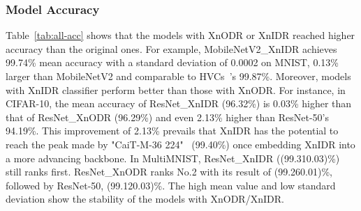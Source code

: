 \documentclass[sn-mathphys,iicol,Numbered]{sn-jnl}
\begin{document}
\subsubsection{Model Accuracy} \label{sec:4.4.1}

Table~\ref{tab:all-acc} shows that the models with XnODR or XnIDR reached higher accuracy than the original ones. For example, MobileNetV2\_XnIDR achieves 99.74\% mean accuracy with a standard deviation of 0.0002 on MNIST, 0.13\% larger than MobileNetV2 and comparable to HVCs~\citep{A8_hvcs}'s 99.87\%. Moreover, models with XnIDR classifier perform better than those with XnODR. For instance, in CIFAR-10, the mean accuracy of ResNet\_XnIDR (96.32\%) is 0.03\% higher than that of ResNet\_XnODR (96.29\%) and even 2.13\% higher than ResNet-50's 94.19\%. This improvement of 2.13\% prevails that XnIDR has the potential to reach the peak made by "CaiT-M-36  224"~\citep{A6_cifar10sota_extra} (99.40\%) once embedding XnIDR into a more advancing backbone. In MultiMNIST, ResNet\_XnIDR ((99.310.03)\%) still ranks first. ResNet\_XnODR ranks No.2 with its result of (99.260.01)\%, followed by ResNet-50, (99.120.03)\%. The high mean value and low standard deviation show the stability of the models with XnODR/XnIDR.
\end{document}
